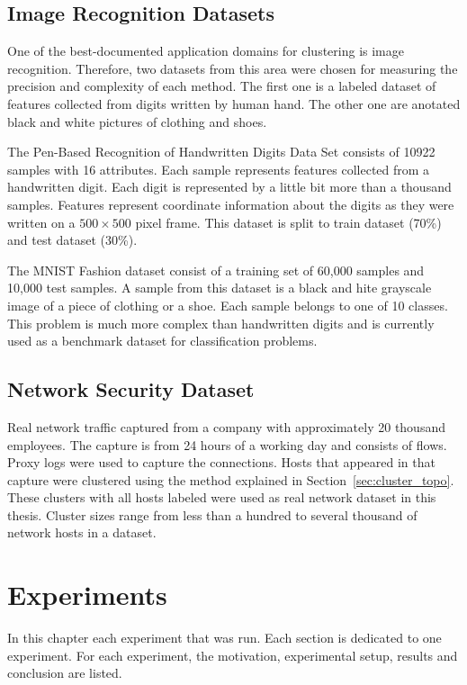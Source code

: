 \documentclass[thesis=B,english]{FITthesis}[2012/10/20]
\begin{document}
\section{Image Recognition Datasets}
One of the best-documented application domains for clustering is image recognition.
Therefore, two datasets from this area were chosen for measuring the precision and complexity of each method.
The first one is a labeled dataset of features collected from digits written by human hand.
The other one are anotated black and white pictures of clothing and shoes.

The Pen-Based Recognition of Handwritten Digits Data Set \cite{dua1998pendigit} consists of 10922 samples with 16 attributes.
Each sample represents features collected from a handwritten digit.
Each digit is represented by a little bit more than a thousand samples.
Features represent coordinate information about the digits as they were written on a $500\times500$ pixel frame.
This dataset is split to train dataset (70\%) and test dataset (30\%).

The MNIST Fashion dataset \cite{xiao2017fashion} consist of a training set of 60,000 samples and 10,000 test samples.
A sample from this dataset is a black and hite grayscale image of a piece of clothing or a shoe.
Each sample belongs to one of 10 classes.
This problem is much more complex than handwritten digits and is currently used as a benchmark dataset for classification problems.

\section{Network Security Dataset}\label{sec:real-data}
Real network traffic captured from a company with approximately 20 thousand employees.
The capture is from 24 hours of a working day and consists of  flows.
Proxy logs were used to capture the connections.
Hosts that appeared in that capture were clustered using the method explained in Section~\ref{sec:cluster_topo}.
These clusters with all hosts labeled were used as real network dataset in this thesis.
Cluster sizes range from less than a hundred to several thousand of network hosts in a dataset.


\chapter{Experiments}\label{ch:experiments}
In this chapter each experiment that was run.
Each section is dedicated to one experiment.
For each experiment, the motivation, experimental setup, results and conclusion are listed.
\end{document}
